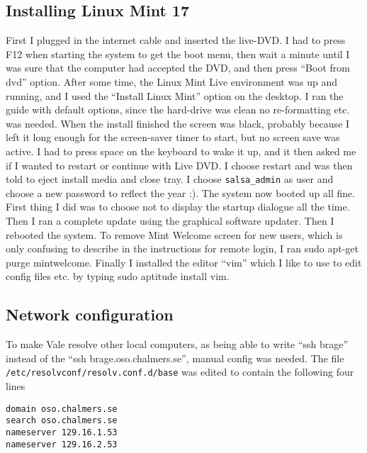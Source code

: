 \subsection{Installing Linux Mint 17}
First I plugged in the internet cable and inserted the live-DVD. I had to press
F12 when starting the system to get the boot menu, then wait a minute until I
was sure that the computer had accepted the DVD, and then press “Boot from dvd”
option. After some time, the Linux Mint Live environment was up and running,
and I used the “Install Linux Mint” option on the desktop. I ran the guide with
default options, since the hard-drive was clean no re-formatting etc. was
needed. When the install finished the screen was black, probably because I left
it long enough for the screen-saver timer to start, but no screen save was
active. I had to press space on the keyboard to wake it up, and it then asked
me if I wanted to restart or continue with Live DVD. I choose restart and was
then told to eject install media and close tray. I choose \verb!salsa_admin! as user
and choose a new password to reflect the year :). The system now booted up all
fine. First thing I did was to choose not to display the startup dialogue all
the time. Then I ran a complete update using the graphical software updater.
Then I rebooted the system. To remove Mint Welcome screen for new users, which
is only confusing to describe in the instructions for remote login, I ran sudo
apt-get purge mintwelcome. Finally I installed the editor “vim” which I like to
use to edit config files etc. by typing sudo aptitude install vim. 

\subsection{Network configuration}
To make Vale resolve other local computers, as being able to write “ssh brage”
instead of the “ssh brage.oso.chalmers.se”, manual config was needed. The file
\verb!/etc/resolvconf/resolv.conf.d/base! was edited to contain the following four
lines
\begin{verbatim}
domain oso.chalmers.se
search oso.chalmers.se
nameserver 129.16.1.53
nameserver 129.16.2.53
\end{verbatim}

